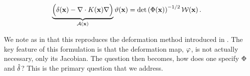 \begin{linenomath*}\begin{equation}
    \underbrace{\Big(\delta(\mathbf{x})- \nabla\cdot K(\mathbf{x})\nabla\Big)}_{\mathcal{A}(\mathbf{x})}\vartheta(\mathbf{x}) =
    \text{det}\left(\Phi(\mathbf{x})\right)^{-1/2}\mathcal{W}(\mathbf{x}) \, .
    \label{eq:spde_general}
\end{equation}\end{linenomath*}
We note as in \citet{RSSB:RSSB777} that this reproduces the deformation method
introduced in \citet{sampson_nonparametric_1992}.
The key feature of this formulation is that the deformation map, $\varphi$, is
not actually necessary, only its Jacobian.
The question then becomes, how does one specify $\Phi$ and $\hat{\delta}$?
This is the primary question that we address.
